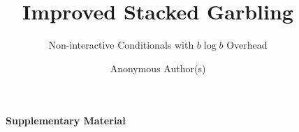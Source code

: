 \documentclass[]{llncs}
\title{%
  Improved Stacked Garbling
}
\subtitle{Non-interactive Conditionals with $b \log b$ Overhead}
\author{Anonymous Author(s)}
\institute{Anonymous Institution}
\author{}
\institute{}
\begin{document}
\maketitle














\newpage

{\LARGE \bf \verb+    + Supplementary Material}

\begin{appendix}

\end{appendix}
\end{document}
